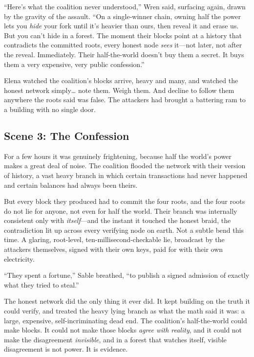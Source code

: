 \documentclass[12pt,letterpaper]{book}
\begin{document}
``Here's what the coalition never understood,'' Wren said, surfacing again, drawn by
the gravity of the assault. ``On a single-winner chain, owning half the power lets
you \emph{hide} your fork until it's heavier than ours, then reveal it and erase
us. But you can't hide in a forest. The moment their blocks point at a history that
contradicts the committed roots, every honest node \emph{sees} it---not later, not
after the reveal. Immediately. Their half-the-world doesn't buy them a secret. It
buys them a very expensive, very public confession.''

Elena watched the coalition's blocks arrive, heavy and many, and watched the honest
network simply\ldots{} note them. Weigh them. And decline to follow them anywhere
the roots said was false. The attackers had brought a battering ram to a building
with no single door.

\hypertarget{scene-3-the-confession}{%
\subsection{Scene 3: The
Confession}\label{scene-3-the-confession}}

For a few hours it was genuinely frightening, because half the world's power makes
a great deal of noise. The coalition flooded the network with their version of
history, a vast heavy branch in which certain transactions had never happened and
certain balances had always been theirs.

But every block they produced had to commit the four roots, and the four roots do
not lie for anyone, not even for half the world. Their branch was internally
consistent only with \emph{itself}---and the instant it touched the honest braid,
the contradiction lit up across every verifying node on earth. Not a subtle bend
this time. A glaring, root-level, ten-millisecond-checkable lie, broadcast by the
attackers themselves, signed with their own keys, paid for with their own
electricity.

``They spent a fortune,'' Sable breathed, ``to publish a signed admission of
exactly what they tried to steal.''

The honest network did the only thing it ever did. It kept building on the truth it
could verify, and treated the heavy lying branch as what the math said it was: a
large, expensive, self-incriminating dead end. The coalition's half-the-world could
make blocks. It could not make those blocks \emph{agree with reality}, and it could
not make the disagreement \emph{invisible}, and in a forest that watches itself,
visible disagreement is not power. It is evidence.
\end{document}
